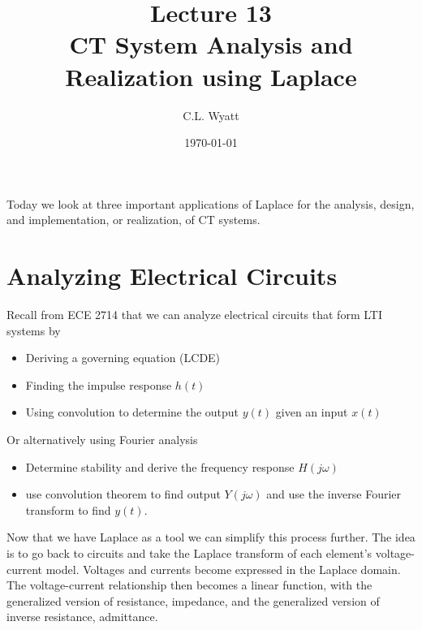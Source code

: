 \documentclass{article}
\begin{document}
\title{Lecture 13\\ CT System Analysis and Realization using Laplace}
\author{C.L. Wyatt}
\date{\today}
\maketitle

Today we look at three important applications of Laplace for the analysis, design, and implementation, or realization, of CT systems.

\section{Analyzing Electrical Circuits}

Recall from ECE 2714 that we can analyze electrical circuits that form LTI systems by

\begin{itemize}
  \item Deriving a governing equation (LCDE)
  \item Finding the impulse response $h(t)$
  \item Using convolution to determine the output $y(t)$ given an input $x(t)$ 
\end{itemize}

Or alternatively using Fourier analysis

\begin{itemize}
  \item Determine stability and derive the frequency response $H(j \omega)$
  \item use convolution theorem to find output $Y(j\omega)$ and use the inverse Fourier transform to find $y(t)$.
\end{itemize}

Now that we have Laplace as a tool we can simplify this process further. The idea is to go back to circuits and take the Laplace transform of each element's voltage-current model. Voltages and currents become expressed in the Laplace domain. The voltage-current relationship then becomes a linear function, with the generalized version of resistance, impedance, and the generalized version of inverse resistance, admittance.
\end{document}
